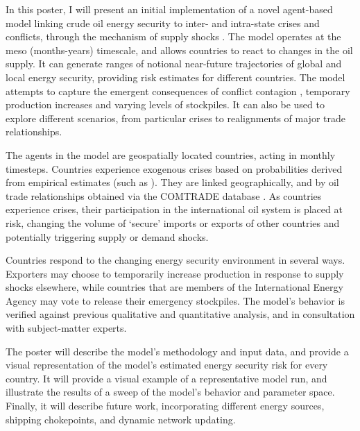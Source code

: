 \documentclass{article}
\begin{document}
In this poster, I will present an initial implementation of a novel agent-based model linking crude oil energy security to inter- and intra-state crises and conflicts, through the mechanism of supply shocks \citep{kilian_2008}. The model operates at the meso (months-years) timescale, and allows countries to react to changes in the oil supply. It can generate ranges of notional near-future trajectories of global and local energy security, providing risk estimates for different countries. The model attempts to capture the emergent consequences of conflict contagion \citep{black_2013}, temporary production increases and varying levels of stockpiles. It can also be used to explore different scenarios, from particular crises to realignments of major trade relationships. 

The agents in the model are geospatially located countries, acting in monthly timesteps. Countries experience exogenous crises based on probabilities derived from empirical estimates (such as \citep{goldstone_2005,eiu_2013,ward_2013}). They are linked geographically, and by oil trade relationships obtained via the COMTRADE database \citep{un_2013}. As countries experience crises, their participation in the  international oil system is placed at risk, changing the volume of `secure' imports or exports of other countries and  potentially triggering supply or demand shocks. 

Countries respond to the changing energy security environment in several ways. Exporters may choose to temporarily increase production in response to supply shocks elsewhere, while countries that are members of the International Energy Agency may vote to release their emergency stockpiles. The model's behavior is verified against previous qualitative and quantitative analysis, and in consultation with subject-matter experts. 

The poster will describe the model's methodology and input data, and provide a visual representation of the model's estimated energy security risk for every country. It will provide a visual example of a representative model run, and illustrate the results of a sweep of the model's behavior and parameter space. Finally, it will describe future work, incorporating different energy sources, shipping chokepoints, and dynamic network updating.

 

\end{document}
